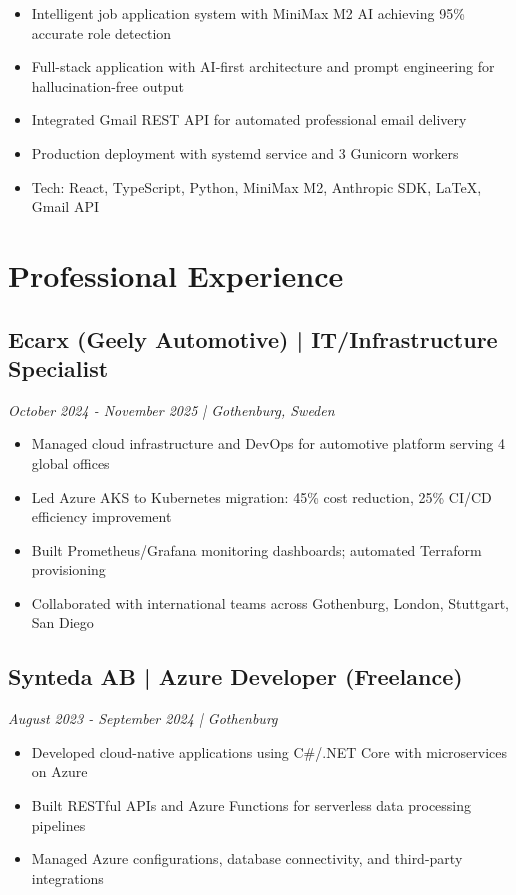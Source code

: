 \documentclass[11pt,a4paper]{article}
\begin{document}
\begin{itemize}[leftmargin=*, itemsep=1pt]
\item Intelligent job application system with MiniMax M2 AI achieving 95\% accurate role detection
\item Full-stack application with AI-first architecture and prompt engineering for hallucination-free output
\item Integrated Gmail REST API for automated professional email delivery
\item Production deployment with systemd service and 3 Gunicorn workers
\item Tech: React, TypeScript, Python, MiniMax M2, Anthropic SDK, LaTeX, Gmail API
\end{itemize}

\section*{Professional Experience}

\subsection*{Ecarx (Geely Automotive) | IT/Infrastructure Specialist}
\textit{October 2024 - November 2025 | Gothenburg, Sweden}

\begin{itemize}[leftmargin=*, itemsep=1pt]
\item Managed cloud infrastructure and DevOps for automotive platform serving 4 global offices
\item Led Azure AKS to Kubernetes migration: 45\% cost reduction, 25\% CI/CD efficiency improvement
\item Built Prometheus/Grafana monitoring dashboards; automated Terraform provisioning
\item Collaborated with international teams across Gothenburg, London, Stuttgart, San Diego
\end{itemize}

\subsection*{Synteda AB | Azure Developer (Freelance)}
\textit{August 2023 - September 2024 | Gothenburg}

\begin{itemize}[leftmargin=*, itemsep=1pt]
\item Developed cloud-native applications using C\#/.NET Core with microservices on Azure
\item Built RESTful APIs and Azure Functions for serverless data processing pipelines
\item Managed Azure configurations, database connectivity, and third-party integrations
\end{itemize}
\end{document}
